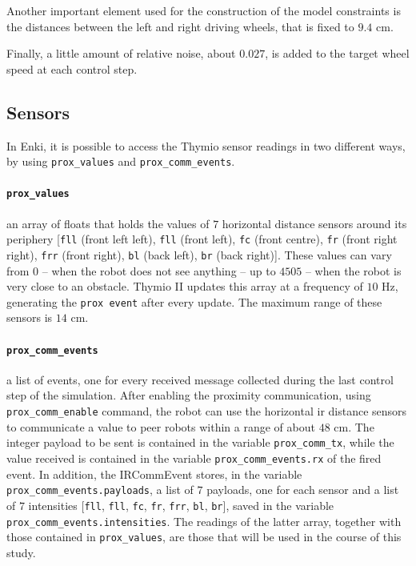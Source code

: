 Another important element used for the construction of the model constraints is 
the distances between the left and right driving wheels, that is fixed to $9.4$ 
\gls{cm}.

Finally, a little amount of relative noise, about $0.027$, is added to the target 
wheel speed at each control step.

\subsection{Sensors}
\label{subsec:enkisensors}
In Enki, it is possible to access the Thymio sensor readings in two different ways, 
by using \texttt{prox\_values} and \texttt{prox\_comm\_events}.

\paragraph{\texttt{prox\_values}}
 an array of floats that holds the values of $7$ horizontal distance sensors around 
 its periphery [\texttt{fll} (front left left), \texttt{fll} (front left), \texttt{fc} (front 
 centre), \texttt{fr} (front right right), \texttt{frr} (front right), \texttt{bl} (back left), 
 \texttt{br} (back right)]. 
These values can vary from $0$ – when the robot does not see anything – up to 
$4505$ – when the robot is very close to an obstacle. 
Thymio II updates this array at a frequency of $10$ \gls{Hz}, generating the 
\texttt{prox event} after every update. 
The maximum range of these sensors is $14$ \gls{cm}.

\paragraph{\texttt{prox\_comm\_events}}

a list of events, one for every received message collected during the last control 
step of the simulation. 
After enabling the proximity communication, using \texttt{prox\_comm\_enable} 
command, the robot can use the horizontal \gls{ir} distance sensors to 
communicate a value to peer robots within a range of about $48$ \gls{cm}. 
The integer payload to be sent is contained in the variable 
\texttt{prox\_comm\_tx}, while the value received is contained in the variable 
\texttt{prox\_comm\_events.rx} of the fired event.
In addition, the IRCommEvent stores, in the variable 
\texttt{prox\_comm\_events.payloads}, a list of $7$ payloads, one for each sensor 
and a list of  $7$ intensities  [\texttt{fll}, \texttt{fll}, \texttt{fc}, \texttt{fr}, 
\texttt{frr}, \texttt{bl}, \texttt{br}], saved in the variable 
\texttt{prox\_comm\_events.intensities}.
The readings of the latter array, together with those contained in 
\texttt{prox\_values}, are those that will be used in the course of this study.

